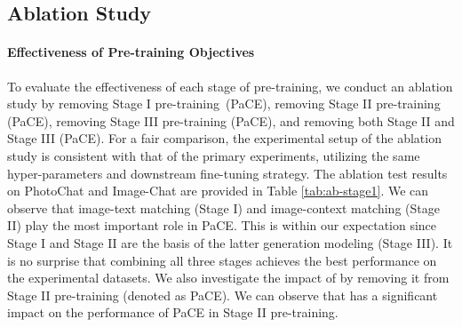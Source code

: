 \documentclass[11pt]{article}
\begin{document}
\begin{table}[t!]
    \centering
    \small
    \caption{
    Multi-modal response generation performances on MMConv.
    }
    \label{tab:ap-mmconvrg}
\end{table}


\subsection{Ablation Study}
\paragraph{Effectiveness of Pre-training Objectives}
To evaluate the effectiveness of each stage of pre-training, we conduct an ablation study by removing Stage I pre-training~(PaCE), removing Stage II pre-training (PaCE), removing Stage III pre-training (PaCE), and removing both Stage II and Stage III (PaCE). For a fair comparison, the experimental setup of the ablation study is consistent with that of the primary experiments, utilizing the same hyper-parameters and downstream fine-tuning strategy. The ablation test results on PhotoChat and Image-Chat are provided in Table \ref{tab:ab-stage1}. We can observe that  image-text matching (Stage I) and image-context matching (Stage II) play the most important role in PaCE.
This is within our expectation since Stage I and Stage II are the basis of the latter generation modeling (Stage III). It is no surprise that combining all three stages achieves the best performance on the experimental datasets.
We also investigate the impact of  by removing it from Stage II pre-training (denoted as PaCE). We can observe that
 has a significant impact on the performance of PaCE in Stage II pre-training.
\end{document}
